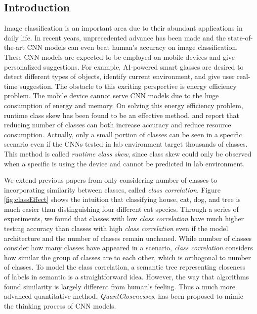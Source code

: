 \documentclass[conference]{IEEEtran}
\begin{document}
\begin{spacing}{0.9}
\section{Introduction}
Image classification is an important area due to their abundant applications in daily life. In recent years, unprecedented advance has been made and the state-of-the-art CNN models can even beat human's accuracy \cite{russakovsky2015imagenet} on image classification. These CNN models are expected to be employed on mobile devices and give personalized suggestions. For example, AI-powered smart glasses are desired to detect different types of objects, identify current environment, and give user real-time suggestion. The obstacle to this exciting perspective is energy efficiency problem. The mobile device cannot serve CNN models due to the huge consumption of energy and memory. On solving this energy efficiency problem, runtime class skew has been found to be an effective method. \cite{han2016mcdnn} and \cite{shen2016fast} report that reducing number of classes can both increase accuracy and reduce resource consumption. Actually, only a small portion of classes can be seen in a specific scenario even if the CNNs tested in lab environment target thousands of classes. This method is called \textit{runtime class skew}, since class skew could only be observed when a specific is using the device and cannot be predicted in lab environment.

We extend previous papers from only considering number of classes to incorporating similarity between classes, called \textit{class correlation}. Figure \ref{fig:classEffect} shows the intuition that classifying house, cat, dog, and tree is much easier than distinguishing four different cat species. Through a series of experiments, we found that classes with low \textit{class correlation} have much higher testing accuracy than classes with high \textit{class correlation} even if the model architecture and the number of classes remain unchaned. While number of classes consider how many classes have appeared in a scenario, \textit{class correlation} considers how similar the group of classes are to each other, which is orthogonal to number of classes. To model the class correlation, a semantic tree representing closeness of labels in semantic is a straightforward idea. However, the way that algorithms found similarity is largely different from human's feeling. Thus a much more advanced quantitative method, \textit{QuantClosenesses}, has been proposed to mimic the thinking process of CNN models. 


\end{spacing}
\end{document}
